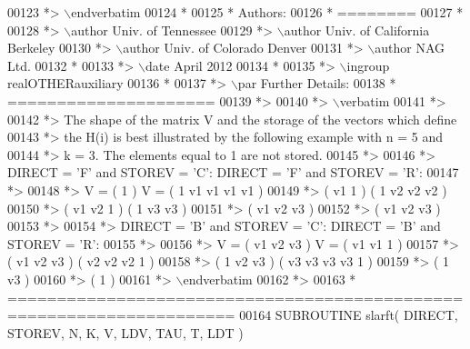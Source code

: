 \begin{DoxyCode}
00123 \textcolor{comment}{*> \(\backslash\)endverbatim}
00124 \textcolor{comment}{*}
00125 \textcolor{comment}{*  Authors:}
00126 \textcolor{comment}{*  ========}
00127 \textcolor{comment}{*}
00128 \textcolor{comment}{*> \(\backslash\)author Univ. of Tennessee }
00129 \textcolor{comment}{*> \(\backslash\)author Univ. of California Berkeley }
00130 \textcolor{comment}{*> \(\backslash\)author Univ. of Colorado Denver }
00131 \textcolor{comment}{*> \(\backslash\)author NAG Ltd. }
00132 \textcolor{comment}{*}
00133 \textcolor{comment}{*> \(\backslash\)date April 2012}
00134 \textcolor{comment}{*}
00135 \textcolor{comment}{*> \(\backslash\)ingroup realOTHERauxiliary}
00136 \textcolor{comment}{*}
00137 \textcolor{comment}{*> \(\backslash\)par Further Details:}
00138 \textcolor{comment}{*  =====================}
00139 \textcolor{comment}{*>}
00140 \textcolor{comment}{*> \(\backslash\)verbatim}
00141 \textcolor{comment}{*>}
00142 \textcolor{comment}{*>  The shape of the matrix V and the storage of the vectors which define}
00143 \textcolor{comment}{*>  the H(i) is best illustrated by the following example with n = 5 and}
00144 \textcolor{comment}{*>  k = 3. The elements equal to 1 are not stored.}
00145 \textcolor{comment}{*>}
00146 \textcolor{comment}{*>  DIRECT = 'F' and STOREV = 'C':         DIRECT = 'F' and STOREV = 'R':}
00147 \textcolor{comment}{*>}
00148 \textcolor{comment}{*>               V = (  1       )                 V = (  1 v1 v1 v1 v1 )}
00149 \textcolor{comment}{*>                   ( v1  1    )                     (     1 v2 v2 v2 )}
00150 \textcolor{comment}{*>                   ( v1 v2  1 )                     (        1 v3 v3 )}
00151 \textcolor{comment}{*>                   ( v1 v2 v3 )}
00152 \textcolor{comment}{*>                   ( v1 v2 v3 )}
00153 \textcolor{comment}{*>}
00154 \textcolor{comment}{*>  DIRECT = 'B' and STOREV = 'C':         DIRECT = 'B' and STOREV = 'R':}
00155 \textcolor{comment}{*>}
00156 \textcolor{comment}{*>               V = ( v1 v2 v3 )                 V = ( v1 v1  1       )}
00157 \textcolor{comment}{*>                   ( v1 v2 v3 )                     ( v2 v2 v2  1    )}
00158 \textcolor{comment}{*>                   (  1 v2 v3 )                     ( v3 v3 v3 v3  1 )}
00159 \textcolor{comment}{*>                   (     1 v3 )}
00160 \textcolor{comment}{*>                   (        1 )}
00161 \textcolor{comment}{*> \(\backslash\)endverbatim}
00162 \textcolor{comment}{*>}
00163 \textcolor{comment}{*  =====================================================================}
00164 \textcolor{keyword}{      SUBROUTINE }slarft( DIRECT, STOREV, N, K, V, LDV, TAU, T, LDT )

\end{DoxyCode}
